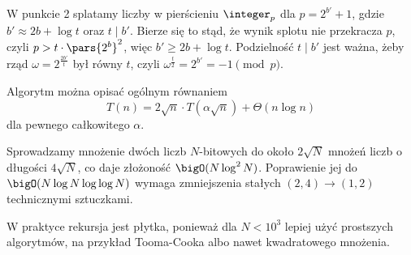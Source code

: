 W punkcie 2 splatamy liczby w pierścieniu \( \integer_p \) dla \( p = 2^{b'} + 1 \), gdzie \( b' \approx 2b + \log t \) oraz \( t \mid b' \). Bierze się to stąd, że wynik splotu nie przekracza \( p \), czyli \( p > t \cdot \pars{2^b}^2 \), więc \( b' \geq 2b + \log t \).
Podzielność \( t \mid b' \) jest ważna, żeby rząd \( \omega = 2^{\frac{2b'}{t}} \) był równy \( t \), czyli \( \omega^{\frac{t}{2}} = 2^{b'} = -1 \pmod{p} \).

Algorytm można opisać ogólnym równaniem
\[
    T(n) = 2 \sqrt{n} \cdot T(\alpha \sqrt{n}) + \Theta(n \log n)
\]
dla pewnego całkowitego \( \alpha \).

Sprowadzamy mnożenie dwóch liczb \( N \)-bitowych do około \( 2\sqrt{N} \) mnożeń liczb o długości \( 4\sqrt{N} \), co daje złożoność \( \bigO(N \log^2 N) \).
Poprawienie jej do \( \bigO(N \log N \log \log N) \) wymaga zmniejszenia stałych \( (2, 4) \rightarrow (1, 2) \) technicznymi sztuczkami.
        
W praktyce rekursja jest płytka, ponieważ dla \( N < 10^3 \) lepiej użyć prostszych algorytmów, na przykład Tooma-Cooka albo nawet kwadratowego mnożenia.

